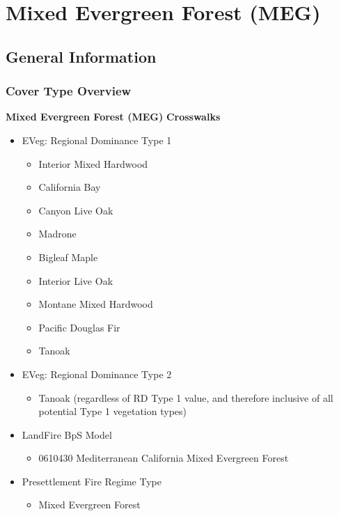 \newpage
\section{Mixed Evergreen Forest (MEG)}
\label{meg-description}

\subsection*{General Information}

\subsubsection{Cover Type Overview}

\textbf{Mixed Evergreen Forest (MEG)}
\newline
\textbf{Crosswalks}
\begin{itemize}
	\item EVeg: Regional Dominance Type 1
	\begin{itemize}
		\item Interior Mixed Hardwood
		\item California Bay
		\item Canyon Live Oak
		\item Madrone
		\item Bigleaf Maple
		\item Interior Live Oak
		\item Montane Mixed Hardwood 
		\item Pacific Douglas Fir
		\item Tanoak
	\end{itemize}

	\item EVeg: Regional Dominance Type 2
	\begin{itemize}
		\item Tanoak (regardless of RD Type 1 value, and therefore inclusive of all potential Type 1 vegetation types)
	\end{itemize}

	\item LandFire BpS Model
	\begin{itemize}
		\item 0610430 Mediterranean California Mixed Evergreen Forest
	\end{itemize}

	\item Presettlement Fire Regime Type
	\begin{itemize}
		\item Mixed Evergreen Forest
	\end{itemize}
\end{itemize}

